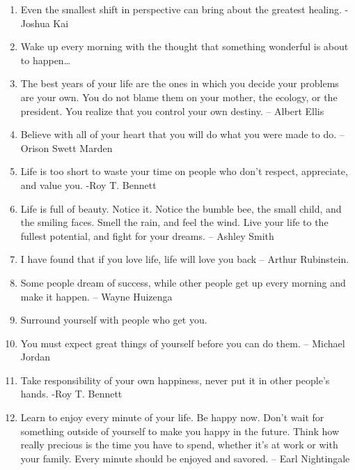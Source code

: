 \begin{enumerate}
            \item Even the smallest shift in perspective can bring about the greatest healing. -Joshua Kai

            \item Wake up every morning with the thought that something wonderful is about to happen…

            \item The best years of your life are the ones in which you decide your problems are your own. You do not blame them on your mother, the ecology, or the president. You realize that you control your own destiny. – Albert Ellis

            \item Believe with all of your heart that you will do what you were made to do. – Orison Swett Marden

            \item Life is too short to waste your time on people who don’t respect, appreciate, and value you. -Roy T. Bennett

            \item Life is full of beauty. Notice it. Notice the bumble bee, the small child, and the smiling faces. Smell the rain, and feel the wind. Live your life to the fullest potential, and fight for your dreams. – Ashley Smith

            \item I have found that if you love life, life will love you back – Arthur Rubinstein.

            \item Some people dream of success, while other people get up every morning and make it happen. – Wayne Huizenga

            \item Surround yourself with people who get you.

            \item You must expect great things of yourself before you can do them. – Michael Jordan

            \item Take responsibility of your own happiness, never put it in other people’s hands. -Roy T. Bennett

            \item Learn to enjoy every minute of your life. Be happy now. Don’t wait for something outside of yourself to make you happy in the future. Think how really precious is the time you have to spend, whether it’s at work or with your family. Every minute should be enjoyed and savored. – Earl Nightingale
        \end{enumerate}


